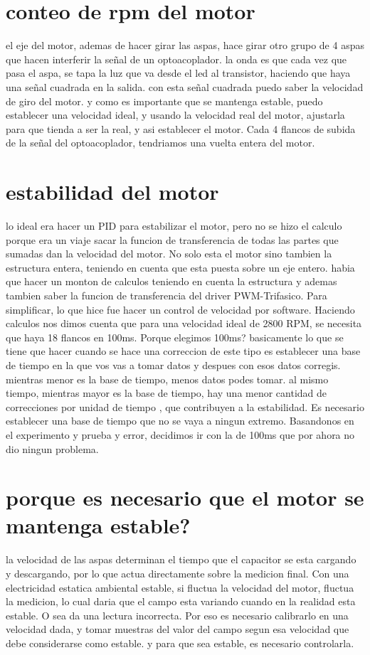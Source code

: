 \documentclass[a4paper]{article}
\begin{document}
\section{conteo de rpm del motor} %
\label{sec:conteo_de_rpm_del_motor}

el eje del motor, ademas de hacer girar las aspas, hace girar otro grupo de 4 aspas que hacen interferir la señal de un optoacoplador. la onda es que cada vez que pasa el aspa, se tapa la luz que va desde el led al transistor, haciendo que haya una señal cuadrada en la salida. con esta señal cuadrada puedo saber la velocidad de giro del motor. y como es importante que se mantenga estable, puedo establecer una velocidad ideal, y usando la velocidad real del motor, ajustarla para que tienda a ser la real, y asi establecer el motor. Cada 4 flancos de subida de la señal del optoacoplador, tendriamos una vuelta entera del motor.


\section*{estabilidad del motor}
lo ideal era hacer un PID para estabilizar el motor, pero no se hizo el calculo porque era un viaje sacar la funcion de transferencia de todas las partes que sumadas dan la velocidad del motor. No solo esta el motor sino tambien la estructura entera, teniendo en cuenta que esta puesta sobre un eje entero. habia que hacer un monton de calculos teniendo en cuenta la estructura y ademas tambien saber la funcion de transferencia del driver PWM-Trifasico.
	Para simplificar, lo que hice fue hacer un control de velocidad por software. Haciendo calculos nos dimos cuenta
que para una velocidad ideal de 2800 RPM, se necesita que haya 18 flancos en 100ms. Porque elegimos 100ms? basicamente lo que se tiene que hacer cuando se hace una correccion de este tipo es establecer una base de tiempo en la que vos vas a tomar datos y despues con esos datos corregis. mientras menor es la base de tiempo, menos datos podes tomar. al mismo tiempo, mientras mayor es la base de tiempo, hay una menor cantidad de correcciones por unidad de tiempo , que contribuyen a la estabilidad. Es necesario establecer una base de tiempo que no se vaya a ningun extremo. Basandonos en el experimento y prueba y error, decidimos ir con la de 100ms que por ahora no dio ningun problema.

\section*{porque es necesario que el motor se mantenga estable?}
la velocidad de las aspas determinan el tiempo que el capacitor se esta cargando y descargando, por lo que actua directamente sobre la medicion final. Con una electricidad estatica ambiental estable, si fluctua la velocidad del motor, fluctua la medicion, lo cual daria que el campo esta variando cuando en la realidad esta estable. O sea da una lectura incorrecta. Por eso es necesario calibrarlo en una velocidad dada, y tomar muestras del valor del campo segun esa velocidad que debe considerarse como estable. y para que sea estable, es necesario controlarla.
\end{document}
